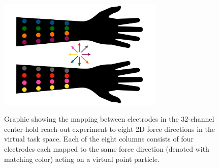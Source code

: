 \begin{figure}
\label{fig:columns}
\centering
\includegraphics[width=0.7\textwidth,height=\textheight]{images/hardware/columns.pdf}
\caption{Graphic showing the mapping between electrodes in the
32-channel center-hold reach-out experiment to eight 2D force directions
in the virtual task space. Each of the eight columns consists of four
electrodes each mapped to the same force direction (denoted with
matching color) acting on a virtual point particle.}\label{fig:columns}
\end{figure}

